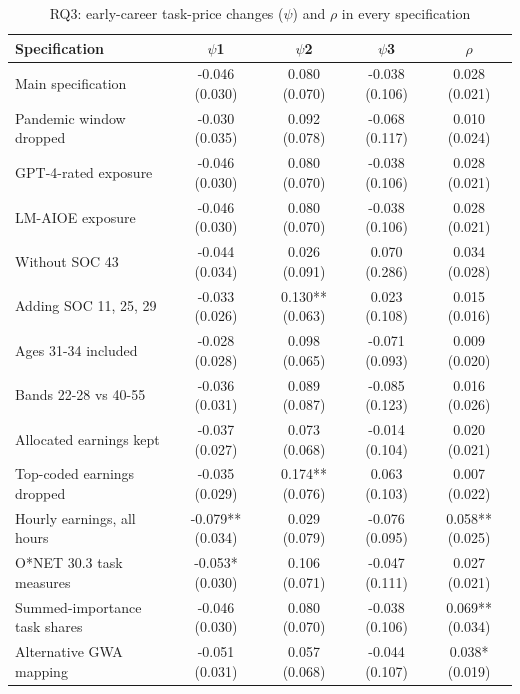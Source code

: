 \begin{table}[htbp]\centering
\caption{RQ3: early-career task-price changes ($\psi$) and $\rho$ in every specification}
\begin{tabular}{lcccc}
\toprule
Specification & $\psi$1 & $\psi$2 & $\psi$3 & $\rho$ \\
\midrule
Main specification & -0.046 (0.030) & 0.080 (0.070) & -0.038 (0.106) & 0.028 (0.021) \\
Pandemic window dropped & -0.030 (0.035) & 0.092 (0.078) & -0.068 (0.117) & 0.010 (0.024) \\
GPT-4-rated exposure & -0.046 (0.030) & 0.080 (0.070) & -0.038 (0.106) & 0.028 (0.021) \\
LM-AIOE exposure & -0.046 (0.030) & 0.080 (0.070) & -0.038 (0.106) & 0.028 (0.021) \\
Without SOC 43 & -0.044 (0.034) & 0.026 (0.091) & 0.070 (0.286) & 0.034 (0.028) \\
Adding SOC 11, 25, 29 & -0.033 (0.026) & 0.130** (0.063) & 0.023 (0.108) & 0.015 (0.016) \\
Ages 31-34 included & -0.028 (0.028) & 0.098 (0.065) & -0.071 (0.093) & 0.009 (0.020) \\
Bands 22-28 vs 40-55 & -0.036 (0.031) & 0.089 (0.087) & -0.085 (0.123) & 0.016 (0.026) \\
Allocated earnings kept & -0.037 (0.027) & 0.073 (0.068) & -0.014 (0.104) & 0.020 (0.021) \\
Top-coded earnings dropped & -0.035 (0.029) & 0.174** (0.076) & 0.063 (0.103) & 0.007 (0.022) \\
Hourly earnings, all hours & -0.079** (0.034) & 0.029 (0.079) & -0.076 (0.095) & 0.058** (0.025) \\
O*NET 30.3 task measures & -0.053* (0.030) & 0.106 (0.071) & -0.047 (0.111) & 0.027 (0.021) \\
Summed-importance task shares & -0.046 (0.030) & 0.080 (0.070) & -0.038 (0.106) & 0.069** (0.034) \\
Alternative GWA mapping & -0.051 (0.031) & 0.057 (0.068) & -0.044 (0.107) & 0.038* (0.019) \\
\bottomrule
\end{tabular}
\par\vspace{2pt}{\footnotesize Estimates of Eq. 7; Standard errors clustered on occupation in parentheses. * p<0.10, ** p<0.05, *** p<0.01.}
\end{table}
